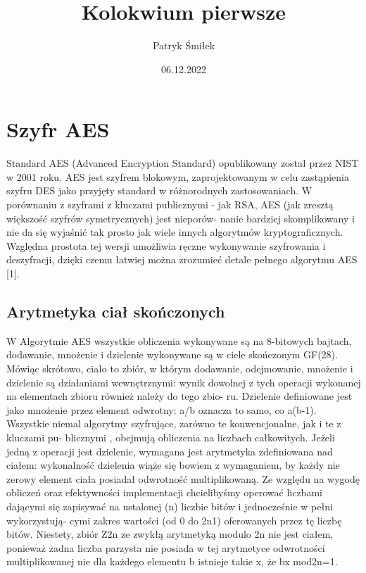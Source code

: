 \documentclass[12pt, letterpaper, titlepage]{article}
\title{Kolokwium pierwsze}
\author{Patryk Śmiłek}
\date{06.12.2022}
\begin{document}
\maketitle
\section{Szyfr AES}
Standard  AES  (Advanced  Encryption  Standard)  opublikowany  został  przez  NIST  w  2001
roku. AES  jest  szyfrem  blokowym,  zaprojektowanym  w  celu  zastąpienia  szyfru  DES  jako
przyjęty  standard  w  różnorodnych  zastosowaniach.  W  porównaniu  z  szyframi  z  kluczami
publicznymi - jak RSA, AES (jak zresztą większość szyfrów symetrycznych) jest nieporów-
nanie bardziej skomplikowany i nie da się wyjaśnić tak prosto jak wiele innych algorytmów
kryptograficznych. Względna prostota tej wersji umożliwia ręczne wykonywanie szyfrowania
i deszyfracji, dzięki czemu łatwiej można zrozumieć detale pełnego algorytmu AES [1].
\subsection{Arytmetyka ciał skończonych}
W Algorytmie AES wszystkie obliczenia wykonywane są na 8-bitowych bajtach, dodawanie,
mnożenie i dzielenie wykonywane są w ciele skończonym GF(28). Mówiąc skrótowo, ciało to
zbiór, w którym dodawanie, odejmowanie, mnożenie i dzielenie są działaniami wewnętrznymi:
wynik dowolnej z tych operacji wykonanej na elementach zbioru również należy do tego zbio-
ru. Dzielenie definiowane jest jako mnożenie przez element odwrotny: a/b oznacza to samo,
co a(b-1).\\

\noindent Wszystkie niemal algorytmy szyfrujące, zarówno te konwencjonalne, jak i te z kluczami pu-
blicznymi , obejmują obliczenia na liczbach całkowitych. Jeżeli jedną z operacji jest dzielenie,
wymagana jest arytmetyka zdefiniowana nad ciałem: wykonalność dzielenia wiąże się bowiem
z wymaganiem, by każdy nie zerowy element ciała posiadał odwrotność multiplikowaną. Ze
względu na wygodę obliczeń oraz efektywności implementacji chcielibyśmy operować liczbami
dającymi się zapisywać na ustalonej (n) liczbie bitów i jednocześnie w pełni wykorzystują-
cymi zakres wartości (od 0 do 2n1) oferowanych przez tę liczbę bitów. Niestety, zbiór Z2n ze
zwykłą arytmetyką modulo 2n nie jest ciałem, ponieważ żadna liczba parzysta nie posiada w
tej arytmetyce odwrotności multiplikowanej nie dla każdego elementu b istnieje takie
x, że bx mod2n=1.\\
\end{document}
